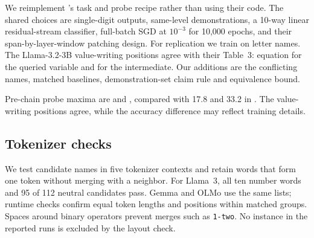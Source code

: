 We reimplement \citet{kudo2026faithful}'s task and probe recipe rather than using their code.
The shared choices are single-digit outputs, same-level demonstrations, a 10-way linear
residual-stream classifier, full-batch SGD at $10^{-3}$ for 10,000 epochs, and their
span-by-layer-window patching design. For replication we train on letter names.
The Llama-3.2-3B value-writing positions agree with their Table~3: equation
 for the queried variable and  for the intermediate.
Our additions are the conflicting names, matched baselines, demonstration-set claim rule and
equivalence bound.

Pre-chain probe maxima are  and ,
compared with 17.8 and 33.2 in \citet{kudo2026faithful}. The value-writing positions
agree, while the accuracy difference may reflect training details.



\subsection{Tokenizer checks}

\label{a-app:tok}
We test candidate names in five tokenizer contexts and retain words that form one token
without merging with a neighbor. For Llama~3, all ten number words and 95 of 112 neutral
candidates pass. Gemma and OLMo use the same lists; runtime checks confirm equal token lengths
and positions within matched groups. Spaces around binary operators prevent merges such as
\texttt{1-two}. No instance in the reported runs is excluded by the layout check.

